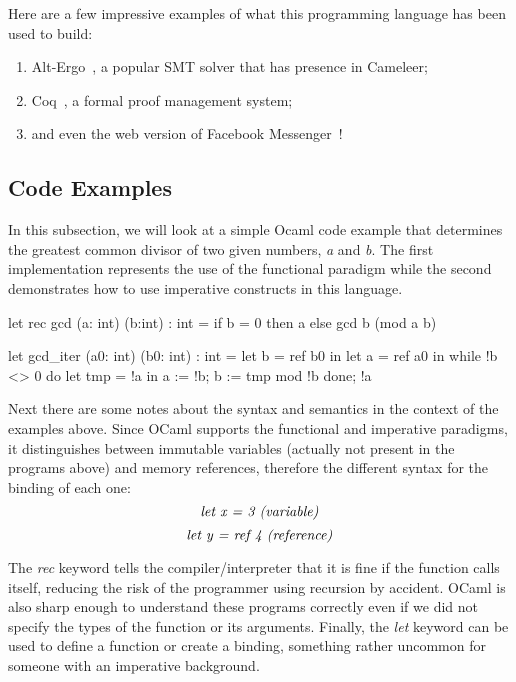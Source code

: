 Here are a few impressive examples of what this programming language has been used to build: 
\begin{enumerate}
  \item Alt-Ergo~\cite{altergo}, a popular SMT solver that has presence in Cameleer;
  \item Coq~\cite{coq}, a formal proof management system;
  \item and even the web version of Facebook Messenger~\cite{messenger}!
\end{enumerate}

\subsection{Code Examples} 
\label{sub:examples_ocaml}

In this subsection, we will look at a simple Ocaml code example that determines the greatest common divisor of two given numbers, \emph{a} and \emph{b}.
The first implementation represents the use of the functional paradigm while the second demonstrates how to use imperative constructs in this language.

\begin{ocamlsmall}
  let rec gcd (a: int) (b:int) : int =
      if b = 0 then a
      else gcd b (mod a b) 
\end{ocamlsmall}

\begin{ocamlsmall}
  let gcd_iter (a0: int) (b0: int) : int =
      let b = ref b0 in
      let a = ref a0 in
      while !b <> 0 do
          let tmp = !a in
          a := !b;
          b := tmp mod !b
      done;
      !a
\end{ocamlsmall}

Next there are some notes about the syntax and semantics in the context of the examples above. 
Since OCaml supports the functional and imperative paradigms, it distinguishes between immutable variables (actually not present in the programs above) and memory references, therefore the different syntax for the binding of each one: 
\[ \emph{let x = 3 (variable)} \]
\vspace{-25pt}
\[ \emph{let y = ref 4 (reference)} \]

The \emph{rec} keyword tells the compiler/interpreter that it is fine if the function calls itself, reducing the risk of the programmer using recursion by accident.
OCaml is also sharp enough to understand these programs correctly even if we did not specify the types of the function or its arguments.
Finally, the \emph{let} keyword can be used to define a function or create a binding, something rather uncommon for someone with an imperative background.


